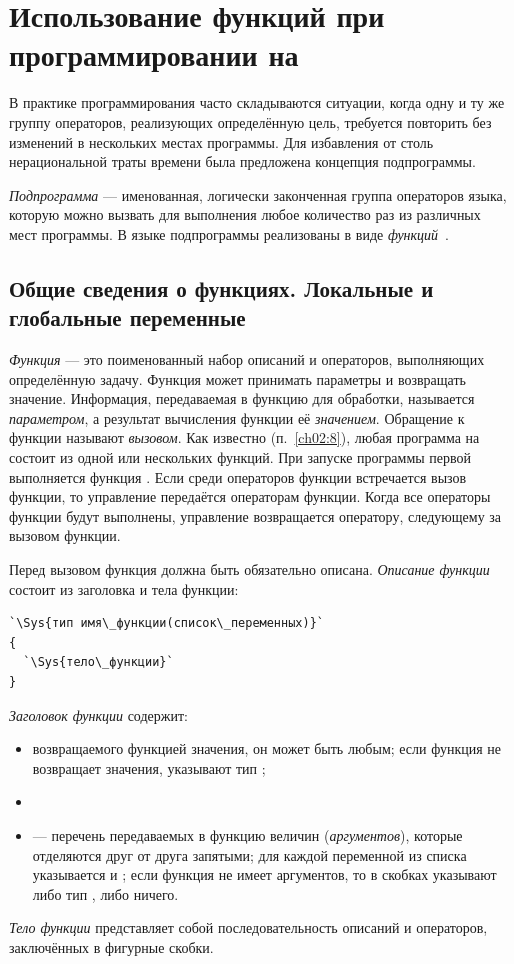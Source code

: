 \chapter[Использование функций при программировании на \Sys{C++}]{Использование функций при программировании на }\label{ch04}
В практике программирования часто складываются ситуации, когда одну и ту же группу операторов, реализующих определённую
цель, требуется повторить без изменений в нескольких местах программы. Для избавления от столь нерациональной траты
времени была предложена концепция подпрограммы.

\emph{Подпрограмма} --- именованная, логически законченная группа операторов языка,
которую можно вызвать для выполнения любое количество раз из различных мест программы. В языке  подпрограммы
реализованы в виде \emph{функций}~\cite{KR}.

\section[Общие сведения о функциях]{Общие сведения о функциях. Локальные и
глобальные переменные}
\emph{Функция} --- это поименованный набор описаний и операторов, выполняющих определённую
задачу. Функция может принимать параметры и возвращать значение. Информация, передаваемая в функцию для обработки,
называется \emph{параметром}, а результат вычисления функции её \emph{значением}. Обращение к
функции называют \emph{вызовом}. Как известно (п.~\ref{ch02:8}), любая программа на  состоит из одной или
нескольких функций. При запуске программы первой выполняется функция . Если среди операторов
функции  встречается вызов функции, то управление передаётся операторам функции. Когда все
операторы функции будут выполнены, управление возвращается оператору, следующему за вызовом функции.

Перед вызовом функция должна быть обязательно описана. \emph{Описание функции}
состоит из заголовка и тела функции:
\begin{lstlisting}
`\Sys{тип имя\_функции(список\_переменных)}`
{
  `\Sys{тело\_функции}`
}
\end{lstlisting}
\emph{Заголовок функции} содержит:

\begin{itemize}
\item {} возвращаемого функцией значения, он может быть любым; если функция не возвращает значения,
указывают тип ;
\item {}
\item {} --- перечень передаваемых в функцию величин (\emph{аргументов}),
которые отделяются друг от друга запятыми; для каждой переменной из списка указывается  и
; если функция не имеет аргументов, то в скобках указывают либо тип , либо
ничего.
\end{itemize}
\emph{Тело функции} представляет собой последовательность описаний и
операторов, заключённых в фигурные скобки.

